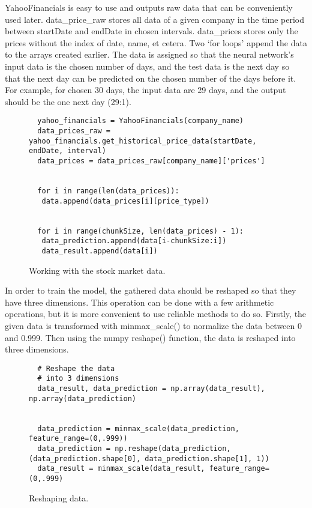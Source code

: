 YahooFinancials is easy to use and outputs raw data that can be conveniently used later. data{\_}price{\_}raw stores all data of a given company in the time period between startDate and endDate in chosen intervals. data{\_}prices stores only the prices without the index of date, name, et cetera.
Two ‘for loops’ append the data to the arrays created earlier. The data is assigned so that the neural network’s input data is the chosen number of days, and the test data is the next day so that the next day can be predicted on the chosen number of the days before it. For example, for chosen 30 days, the input data are 29 days, and the output should be the one next day (29:1).

\clearpage
\begin{figure}
\centering
\begin{lstlisting}
  yahoo_financials = YahooFinancials(company_name)
  data_prices_raw = yahoo_financials.get_historical_price_data(startDate, endDate, interval)
  data_prices = data_prices_raw[company_name]['prices']
  
  
  for i in range(len(data_prices)):
   data.append(data_prices[i][price_type])
  
  
  for i in range(chunkSize, len(data_prices) - 1):
   data_prediction.append(data[i-chunkSize:i])
   data_result.append(data[i])
\end{lstlisting}
\caption{Working with the stock market data.}
\label{fig:pseudocode:listings}
\end{figure}

In order to train the model, the gathered data should be reshaped so that they have three dimensions. This operation can be done with a few arithmetic operations, but it is more convenient to use reliable methods to do so. Firstly, the given data is transformed with minmax{\_}scale() to normalize the data between 0 and 0.999. Then using the numpy reshape() function, the data is reshaped into three dimensions.

\clearpage
\begin{figure}
\centering
\begin{lstlisting}
  # Reshape the data
  # into 3 dimensions
  data_result, data_prediction = np.array(data_result), np.array(data_prediction)
  
  
  data_prediction = minmax_scale(data_prediction, feature_range=(0,.999))
  data_prediction = np.reshape(data_prediction, (data_prediction.shape[0], data_prediction.shape[1], 1))
  data_result = minmax_scale(data_result, feature_range=(0,.999)
\end{lstlisting}
\caption{Reshaping data.}
\label{fig:pseudocode:listings}
\end{figure}